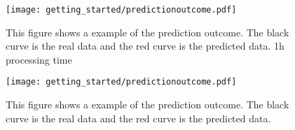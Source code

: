 \begin{figure}[h]
  \texttt{[image: getting\_started/predictionoutcome.pdf]}
  \caption{This figure shows a example of the prediction outcome. The black curve is the real data and the red curve is the predicted data. 1h processing time}
  \label{fig:predictionoutcome}
\end{figure}

\begin{figure*}[h]
  \texttt{[image: getting\_started/predictionoutcome.pdf]}
  \caption{This figure shows a example of the prediction outcome. The black curve is the real data and the red curve is the predicted data.}
  \label{fig:predictionoutcome}
\end{figure*}
